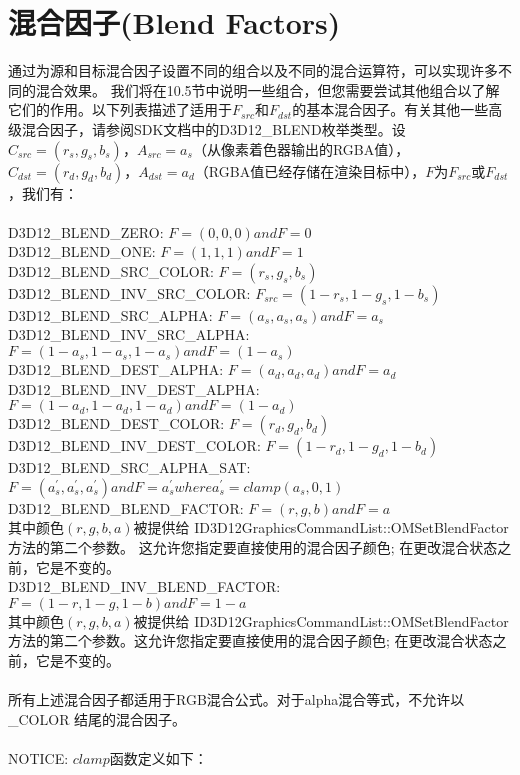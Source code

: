 \section{混合因子(Blend Factors)}
\begin{flushleft}
通过为源和目标混合因子设置不同的组合以及不同的混合运算符，可以实现许多不同的混合效果。 我们将在10.5节中说明一些组合，但您需要尝试其他组合以了解它们的作用。以下列表描述了适用于$F_{src}$和$F_{dst}$的基本混合因子。有关其他一些高级混合因子，请参阅SDK文档中的D3D12\_BLEND枚举类型。设$C_{src}=(r_{s},g_{s},b_{s})$，$A_{src}=a_{s}$（从像素着色器输出的RGBA值），$C_{dst}=(r_{d},g_{d},b_{d})$，$A_{dst}=a_{d}$（RGBA值已经存储在渲染目标中），$F$为$F_{src}$或$F_{dst}$，我们有：\\
~\\
D3D12\_BLEND\_ZERO: $F=(0,0,0) and F=0$\\
D3D12\_BLEND\_ONE: $F=(1,1,1) and F=1$\\
D3D12\_BLEND\_SRC\_COLOR: $F=(r_{s},g_{s},b_{s})$\\
D3D12\_BLEND\_INV\_SRC\_COLOR: $F_{src}=(1−r_{s}, 1−g_{s},1−b_{s})$\\
D3D12\_BLEND\_SRC\_ALPHA: $F=(a_{s},a_{s},a_{s}) and F=a_{s}$\\
D3D12\_BLEND\_INV\_SRC\_ALPHA: $F=(1−a_{s},1−a_{s},1−a_{s}) and F=(1−a_{s})$\\
D3D12\_BLEND\_DEST\_ALPHA: $F=(a_{d},a_{d},a_{d}) and F=a_{d}$\\
D3D12\_BLEND\_INV\_DEST\_ALPHA: $F=(1−a_{d},1−a_{d},1−a_{d}) and F=(1−a_{d})$\\
D3D12\_BLEND\_DEST\_COLOR: $F=(r_{d},g_{d},b_{d})$\\
D3D12\_BLEND\_INV\_DEST\_COLOR: $F=(1−r_{d},1−g_{d},1−b_{d})$\\
D3D12\_BLEND\_SRC\_ALPHA\_SAT: $F=(a^{'}_{s},a^{'}_{s},a^{'}_{s}) and F=a^{'}_{s} where a^{'}_{s}=clamp(a_{s},0,1)$\\

D3D12\_BLEND\_BLEND\_FACTOR: $F=(r,g,b) and F=a$\\
其中颜色$(r,g,b,a)$被提供给 ID3D12GraphicsCommandList::OMSetBlendFactor 方法的第二个参数。 这允许您指定要直接使用的混合因子颜色; 在更改混合状态之前，它是不变的。\\

D3D12\_BLEND\_INV\_BLEND\_FACTOR: $F=(1-r,1-g,1-b) and F=1-a$\\
其中颜色$(r,g,b,a)$被提供给 ID3D12GraphicsCommandList::OMSetBlendFactor 方法的第二个参数。这允许您指定要直接使用的混合因子颜色; 在更改混合状态之前，它是不变的。\\
~\\
所有上述混合因子都适用于RGB混合公式。对于alpha混合等式，不允许以 \_COLOR 结尾的混合因子。\\
~\\
NOTICE: $clamp$函数定义如下：\\
\end{flushleft}

